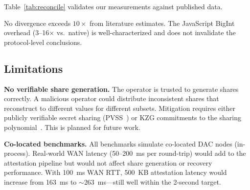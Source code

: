 Table~\ref{tab:reconcile} validates our measurements against published data.

\begin{table}[htbp]
\centering
\caption{Benchmark Reconciliation with Published Data}
\label{tab:reconcile}
\end{table}

No divergence exceeds $10\times$ from literature estimates. The JavaScript
BigInt overhead (3--16$\times$ vs.\ native) is well-characterized and does
not invalidate the protocol-level conclusions.

\subsection{Limitations}
\label{sec:limitations}

\textbf{No verifiable share generation.} The operator is trusted to generate
shares correctly. A malicious operator could distribute inconsistent shares
that reconstruct to different values for different subsets. Mitigation
requires either publicly verifiable secret sharing
(PVSS~\cite{gentry2022pvss}) or KZG commitments to the sharing
polynomial~\cite{feist2019das}. This is planned for future work.

\textbf{Co-located benchmarks.} All benchmarks simulate co-located DAC nodes
(in-process). Real-world WAN latency (50--200~ms per round-trip) would add
to the attestation pipeline but would not affect share generation or recovery
performance. With 100~ms WAN RTT, 500~KB attestation latency would increase
from 163~ms to $\sim$263~ms---still well within the 2-second target.

